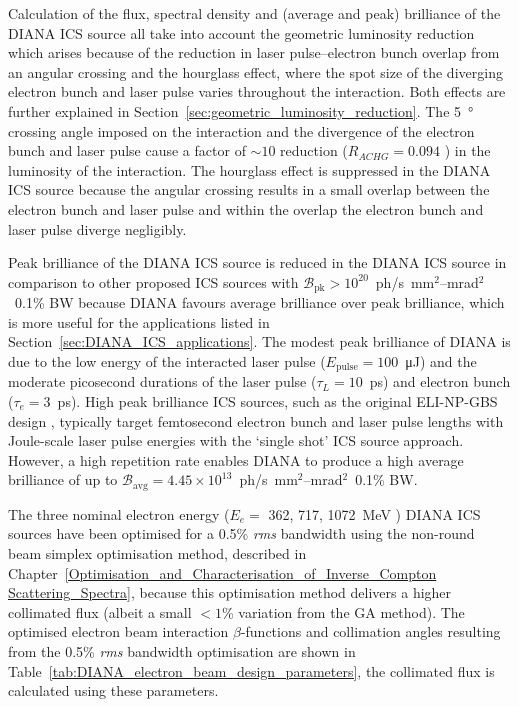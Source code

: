 \documentclass[../main.tex]{subfiles}
\begin{document}
Calculation of the flux, spectral density and (average and peak) brilliance of the DIANA ICS source all take into account the geometric luminosity reduction which arises because of the reduction in laser pulse--electron bunch overlap from an angular crossing and the hourglass effect, where the spot size of the diverging electron bunch and laser pulse varies throughout the interaction. Both effects are further explained in Section~\ref{sec:geometric_luminosity_reduction}. The 5~\si{\degree} crossing angle imposed on the interaction and the divergence of the electron bunch and laser pulse cause a factor of $\sim10$ reduction ($R_{ACHG}=0.094$ \cite{miyahara2008luminosity}) in the luminosity of the interaction. The hourglass effect is suppressed in the DIANA ICS source because the angular crossing results in a small overlap between the electron bunch and laser pulse and within the overlap the electron bunch and laser pulse diverge negligibly.  

Peak brilliance of the DIANA ICS source is reduced in the DIANA ICS source in comparison to other proposed ICS sources \cite{barty2011overview} with $\mathcal{B}_{\mathrm{pk}}>10^{20}$~ph/\si{\second}~\si{\milli\meter}$^{2}$--\si{\milli\radian}$^{2}$~0.1\% BW because DIANA favours average brilliance over peak brilliance, which is more useful for the applications listed in Section~\ref{sec:DIANA_ICS_applications}. The modest peak brilliance of DIANA is due to the low energy of the interacted laser pulse ($E_{\mathrm{pulse}} = 100$~\si{\micro\joule}) and the moderate picosecond durations of the laser pulse ($\tau_{L}=10$~\si{\pico\second}) and electron bunch ($\tau_{e}=3$~\si{\pico\second}). High peak brilliance ICS sources, such as the original ELI-NP-GBS design \cite{adriani2014technical}, typically target femtosecond electron bunch and laser pulse lengths with Joule-scale laser pulse energies with the `single shot' ICS source approach. However, a high repetition rate enables DIANA to produce a high average brilliance of up to $\mathcal{B}_{\mathrm{avg}}=4.45\times 10^{13}$~ph/\si{\second}~\si{\milli\meter}$^{2}$--\si{\milli\radian}$^{2}$~0.1\% BW. 

The three nominal electron energy ($E_{e}=$ 362, 717, 1072~\si{\mega\electronvolt} ) DIANA ICS sources have been optimised for a 0.5\% \textit{rms} bandwidth using the non-round beam simplex optimisation method, described in Chapter~\ref{Optimisation_and_Characterisation_of_Inverse_Compton Scattering_Spectra}, because this optimisation method delivers a higher collimated flux (albeit a small $<1$\% variation from the GA method). The optimised electron beam interaction $\beta$-functions and collimation angles resulting from the 0.5\% \textit{rms} bandwidth optimisation are shown in Table~\ref{tab:DIANA_electron_beam_design_parameters}, the collimated flux is calculated using these parameters.
\end{document}
